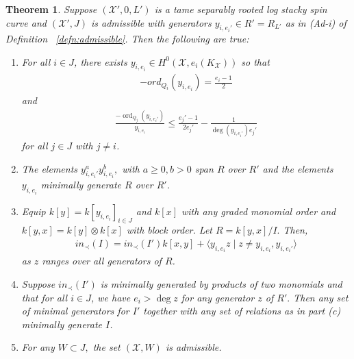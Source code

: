 \documentclass{amsart}
\theoremstyle{plain}
\newtheorem{thm}{Theorem}[section]
\theoremstyle{definition}
\theoremstyle{remark}
\numberwithin{equation}{section}
\newcommand \sx{\mathscr X}
\DeclareMathOperator{\ord}{ord}
\newcommand \subhalf[1]{\frac{{#1} - 1}{2{#1}}}
\begin{document}
\begin{thm}
\label{thm:ram_order_ind}
Suppose $(\sx', 0, L')$ is a tame separably rooted log stacky spin
curve and $(\sx', J)$ is admissible with generators $y_{i,e_i'} \in
R' = R_{L'}$ as in (Ad-i) of Definition ~\ref{defn:admissible}.
Then the following are true:
\begin{enumerate}
	\item[(a)] For all $i \in J$, there exists $y_{i,e_i} \in
		H^0(\sx, e_i(K_\sx))$ so that
		\begin{align*}
			-ord_{Q_i}(y_{i,e_i}) = \frac{e_i-1}{2}
		\end{align*}
		and
		\begin{align*}
			\frac{-\ord_{Q_j}(y_{i,e_i'})}{y_{i,e_i}} \leq \subhalf{e_j'}-
			\frac{1}{\deg(y_{i,e_i'})e_j'}
		\end{align*}
		for all $j \in J$ with $j \neq i$.
	\item[(b)] The elements $y_{i,e_i'}^ay_{i,e_i}^b,$ with $a \geq 0,
		b > 0$ span $R$ over $R'$ and the elements $y_{i,e_i}$ minimally
		generate $R$ over $R'$.
	\item[(c)] Equip $k[y] = k[y_{i,e_i}]_{i \in J}$ and $k[x]$ with
		any graded monomial order and $k[y,x] = k[y] \otimes k[x]$ with
		block order. Let $R = k[y,x]/I.$ Then,
		\begin{align*}
			in_\prec(I) = in_\prec(I')k[x,y] + \langle y_{i,e_i}z \mid z 
			\neq y_{i,e_i},y_{i,e_i'} \rangle
		\end{align*}
		as $z$ ranges over all generators of $R$.
	\item[(d)] Suppose $in_\prec(I')$ is minimally generated by
		products of two monomials and that for all $i \in J$, we have $e
		_i > \deg z$ for any generator $z$ of $R'.$ Then any set of
		minimal generators for $I'$ together with any set of relations as in 
		part (c) minimally generate $I$.
	\item[(e)] For any $W \subset J,$ the set $(\sx,W)$ is admissible.
\end{enumerate}
\end{thm}
\end{document}
